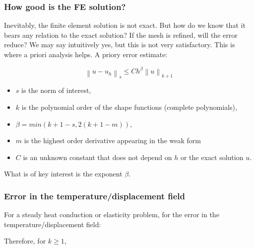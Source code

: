 \documentclass[notes]{beamer}
\begin{document}
\begin{frame}
\frametitle{How good is the FE solution?}
Inevitably, the finite element solution is not exact. But how do we know that it bears
any relation to the exact solution? If the mesh is refined, will the error reduce? We may
say intuitively yes, but this is not very satisfactory. This is where a priori analysis helps.
A priory error estimate:

\begin{equation*}
	\left\lVert u - u_h \right\rVert_s \le C h^\beta \left\lVert u  \right\rVert_{k+1}
\end{equation*}

\begin{itemize}
	\item $s$ is the norm of interest,
	\item $k$ is the polynomial order of the shape functions (complete polynomials), 
	\item $\beta = min (k + 1 - s, 2 (k + 1 - m))$,
	\item $m$ is the highest order derivative appearing in the weak form
	\item $C$ is an unknown constant that does not depend on $h$ or the exact solution $u$.
\end{itemize}
 What is of key interest is the exponent $\beta$.

\end{frame}


\begin{frame}
\frametitle{Error in the temperature/displacement field}
For a steady heat conduction or elasticity problem, for the error in the temperature/displacement field:


Therefore, for $k \ge 1$,

\end{frame}
\end{document}
